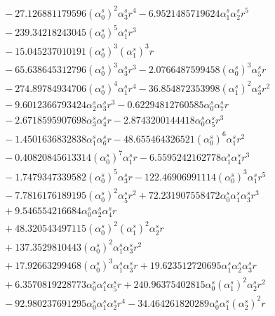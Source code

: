 \documentclass[10pt]{article}
\begin{document}
\begin{align*}
&{}  - 27.126881179596 \left(\alpha_{0}^s\right)^{2} \alpha_{3}^s r^{4} - 6.9521485719624 \alpha_{1}^s \alpha_{2}^s r^{5} \\
&{}  - 239.34218243045 \left(\alpha_{0}^s\right)^{5} \alpha_{1}^s r^{3} \\
&{}  - 15.045237010191 \left(\alpha_{0}^s\right)^{3} \left(\alpha_{1}^s\right)^{3} r \\
&{}  - 65.638645312796 \left(\alpha_{0}^s\right)^{3} \alpha_{3}^s r^{3} - 2.0766487599458 \left(\alpha_{0}^s\right)^{3} \alpha_{5}^s r \\
&{}  - 274.89784934706 \left(\alpha_{0}^s\right)^{4} \alpha_{1}^s r^{4} - 36.854872353998 \left(\alpha_{1}^s\right)^{2} \alpha_{3}^s r^{2} \\
&{}  - 9.6012366793424 \alpha_{2}^s \alpha_{3}^s r^{3} - 0.62294812760585 \alpha_{0}^s \alpha_{7}^s r \\
&{}  - 2.6718595907698 \alpha_{3}^s \alpha_{4}^s r - 2.8743200144418 \alpha_{0}^s \alpha_{5}^s r^{3} \\
&{}  - 1.4501636832838 \alpha_{1}^s \alpha_{6}^s r - 48.655464326521 \left(\alpha_{0}^s\right)^{6} \alpha_{1}^s r^{2} \\
&{}  - 0.40820845613314 \left(\alpha_{0}^s\right)^{7} \alpha_{1}^s r - 6.5595242162778 \alpha_{1}^s \alpha_{4}^s r^{3} \\
&{}  - 1.7479347339582 \left(\alpha_{0}^s\right)^{5} \alpha_{3}^s r - 122.46906991114 \left(\alpha_{0}^s\right)^{3} \alpha_{1}^s r^{5} \\
&{}  - 7.7816176189195 \left(\alpha_{0}^s\right)^{2} \alpha_{5}^s r^{2} + 72.231907558472 \alpha_{0}^s \alpha_{1}^s \alpha_{3}^s r^{3} \\
&{}  + 9.546554216684 \alpha_{0}^s \alpha_{2}^s \alpha_{4}^s r \\
&{}  + 48.320543497115 \left(\alpha_{0}^s\right)^{2} \left(\alpha_{1}^s\right)^{2} \alpha_{2}^s r \\
&{}  + 137.3529810443 \left(\alpha_{0}^s\right)^{2} \alpha_{1}^s \alpha_{3}^s r^{2} \\
&{}  + 17.92663299468 \left(\alpha_{0}^s\right)^{3} \alpha_{1}^s \alpha_{3}^s r + 19.623512720695 \alpha_{1}^s \alpha_{2}^s \alpha_{3}^s r \\
&{}  + 6.3570819228773 \alpha_{0}^s \alpha_{1}^s \alpha_{5}^s r + 240.96375402815 \alpha_{0}^s \left(\alpha_{1}^s\right)^{2} \alpha_{2}^s r^{2} \\
&{}  - 92.980237691295 \alpha_{0}^s \alpha_{1}^s \alpha_{2}^s r^{4} - 34.464261820289 \alpha_{0}^s \alpha_{1}^s \left(\alpha_{2}^s\right)^{2} r \\

\end{align*}
\end{document}
